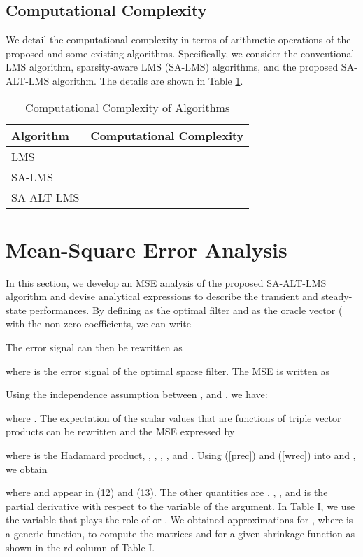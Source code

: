 \documentclass[10pt,onecolumn]{IEEEtran}
\begin{document}
\subsection{Computational Complexity}

We detail the computational complexity in terms of arithmetic
operations of the proposed and some existing algorithms.
Specifically, we consider the conventional LMS algorithm,
sparsity-aware LMS (SA-LMS) algorithms, and the proposed SA-ALT-LMS
algorithm. The details are shown in Table \ref{table2}.

\begin{table}[h]
\centering \small \vspace{-0.75em} \caption{Computational Complexity
of Algorithms} \vspace{-1.0em}
\begin{tabular}{ll}
\hline
Algorithm & Computational Complexity \\
\hline
 LMS &  \\
SA-LMS & \\
SA-ALT-LMS &  \\
\hline
\end{tabular}
\label{table2}
\end{table}
\vspace{-1.0em}

\section{Mean-Square Error Analysis}

In this section, we develop an MSE analysis of the proposed
SA-ALT-LMS algorithm and devise analytical expressions to describe
the transient and steady-state performances. By defining
 as the optimal filter and  as the oracle vector ( with the non-zero coefficients, we
can write

The error signal can then be rewritten as

where  is the error signal of the optimal sparse
filter. The MSE is written as

Using the independence assumption between ,
 and , we have:

where .
The expectation of the scalar values that are functions of triple
vector products can be rewritten \cite{haykin} and the MSE expressed
by

where  is the Hadamard product, , , ,
, and . Using
(\ref{prec}) and (\ref{wrec}) into  and
, we obtain


where  and  appear in (12) and (13). The other
quantities are ,
, ,  and
 is the partial derivative with respect to the variable
of the argument. In Table I, we use the variable 
that plays the role of  or .
We obtained approximations for , where
 is a generic function, to compute the matrices
 and  for a given shrinkage
function as shown in the rd column of Table I.
\end{document}
